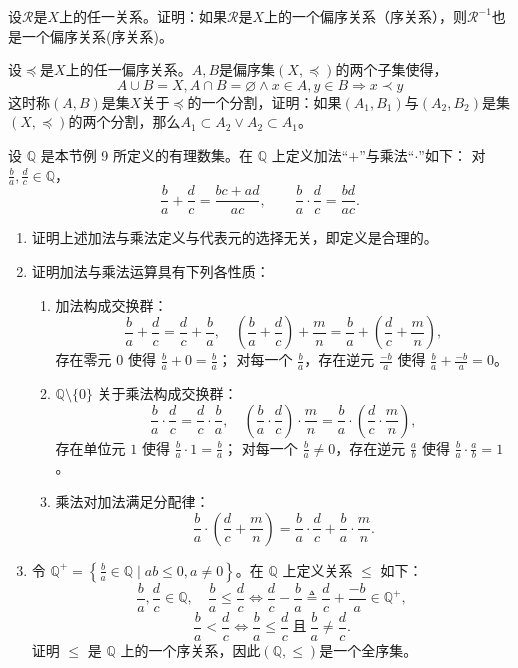 \begin{exercise}
	设$\mathscr{R}$是$X$上的任一关系。证明：如果$\mathscr{R}$是$X$上的一个偏序关系（序关系），则$\mathscr{R}^{-1}$也是一个偏序关系(序关系)。
\end{exercise}

\begin{exercise}
	设$\preceq$是$X$上的任一偏序关系。$A,B$是偏序集$(X,\preceq)$的两个子集使得，
	\[
		A \cup B = X, A\cap B =\varnothing \land x \in A, y \in B \Rightarrow x \prec y 
	\]
	这时称$(A,B)$是集$X$关于$\preceq$的一个分割，证明：如果$(A_1,B_1)$与$(A_2,B_2)$是集$(X,\preceq)$的两个分割，那么$A_1 \subset A_2 \lor A_2 \subset A_1$。
	
\end{exercise}


\begin{exercise}
	\item 设 $\mathbb{Q}$ 是本节例 9 所定义的有理数集。在 $\mathbb{Q}$ 上定义加法“$+$”与乘法“$\cdot$”如下：
	对 $\frac{b}{a},\frac{d}{c} \in \mathbb{Q}$，
	\[
	\frac{b}{a} + \frac{d}{c} = \frac{bc + ad}{ac},\qquad
	\frac{b}{a} \cdot \frac{d}{c} = \frac{bd}{ac}.
	\]
	\begin{enumerate}[label=\arabic*)]
		\item 证明上述加法与乘法定义与代表元的选择无关，即定义是合理的。
		\item 证明加法与乘法运算具有下列各性质：
		\begin{enumerate}[label=\alph*)]
			\item 加法构成交换群：
			\[
			\frac{b}{a} + \frac{d}{c} = \frac{d}{c} + \frac{b}{a},\quad
			\left(\frac{b}{a} + \frac{d}{c}\right) + \frac{m}{n} = \frac{b}{a} + \left(\frac{d}{c} + \frac{m}{n}\right),
			\]
			存在零元 $0$ 使得 $\frac{b}{a} + 0 = \frac{b}{a}$；
			对每一个 $\frac{b}{a}$，存在逆元 $\frac{-b}{a}$ 使得 $\frac{b}{a} + \frac{-b}{a} = 0$。
			\item $\mathbb{Q}\setminus\{0\}$ 关于乘法构成交换群：
			\[
			\frac{b}{a} \cdot \frac{d}{c} = \frac{d}{c} \cdot \frac{b}{a},\quad
			\left(\frac{b}{a} \cdot \frac{d}{c}\right) \cdot \frac{m}{n} = \frac{b}{a} \cdot \left(\frac{d}{c} \cdot \frac{m}{n}\right),
			\]
			存在单位元 $1$ 使得 $\frac{b}{a} \cdot 1 = \frac{b}{a}$；
			对每一个 $\frac{b}{a} \neq 0$，存在逆元 $\frac{a}{b}$ 使得 $\frac{b}{a} \cdot \frac{a}{b} = 1$。
			\item 乘法对加法满足分配律：
			\[
			\frac{b}{a} \cdot \left(\frac{d}{c} + \frac{m}{n}\right) = \frac{b}{a} \cdot \frac{d}{c} + \frac{b}{a} \cdot \frac{m}{n}.
			\]
		\end{enumerate}
		\item 令 $\mathbb{Q}^+ = \left\{ \frac{b}{a} \in \mathbb{Q} \mid ab \le 0 ,a \ne 0 \right\}$。在 $\mathbb{Q}$ 上定义关系 $\le$ 如下：
		\[
		\frac{b}{a}, \frac{d}{c} \in \mathbb{Q},\quad
		\frac{b}{a} \leq \frac{d}{c} \iff \frac{d}{c} - \frac{b}{a} \triangleq \frac{d}{c} + \frac{-b}{a} \in \mathbb{Q}^+,
		\]
		\[
		\frac{b}{a} < \frac{d}{c} \iff \frac{b}{a} \leq \frac{d}{c}\ \text{且}\ \frac{b}{a} \neq \frac{d}{c}.
		\]
		证明 $\leq$ 是 $\mathbb{Q}$ 上的一个序关系，因此$(\mathbb{Q},\le)$是一个全序集。
		

\end{enumerate}
\end{exercise}
